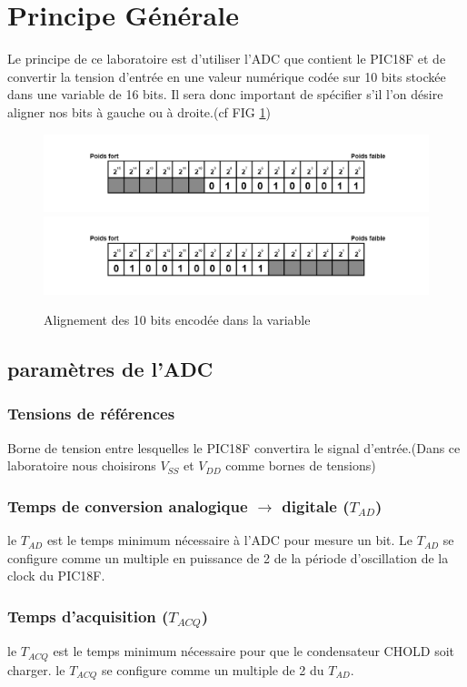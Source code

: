 \section{Principe Générale}
Le principe de ce laboratoire est d'utiliser l'ADC que contient le PIC18F et de convertir la tension d'entrée en une valeur numérique codée sur 10 bits stockée dans une variable de 16 bits. Il sera donc important de spécifier s'il l'on désire aligner nos bits à gauche ou à droite.(cf FIG \ref{align})

\begin{figure}
\begin{center}
\begin{framed}
\includegraphics[scale=0.8]{images/aligndroite.png}
\includegraphics[scale=0.8]{images/aligngauche.png}
\caption{Alignement des 10 bits encodée dans la variable}
\label{align}
\end{framed}
\end{center}
\end{figure}

\subsection{paramètres de l'ADC}

\subsubsection*{Tensions de références}
Borne de tension entre lesquelles le PIC18F convertira le signal d'entrée.(Dans ce laboratoire nous choisirons  $V_{SS}$ et $V_{DD}$ comme bornes de tensions)
\subsubsection*{Temps de conversion analogique $\rightarrow$ digitale  ($T_{AD}$)}
le $T_{AD}$  est le temps minimum nécessaire à l'ADC pour mesure un bit. Le $T_{AD}$ se configure comme un multiple en puissance de 2 de la période d'oscillation de la clock du PIC18F.
\subsubsection*{Temps d'acquisition ($T_{ACQ}$)}
le $T_{ACQ}$ est le temps minimum nécessaire pour que le condensateur CHOLD soit charger. le $T_{ACQ}$  se configure comme un multiple de 2 du $T_{AD}$. 
 